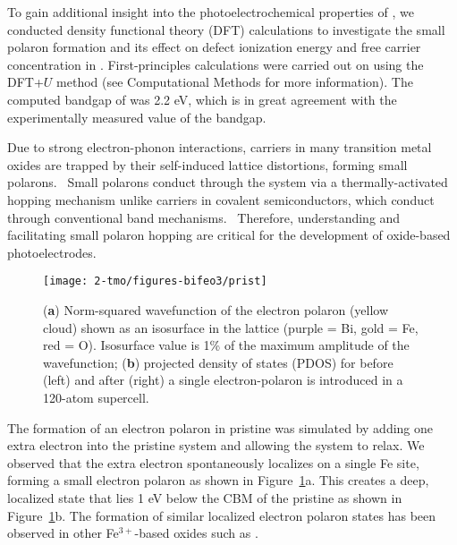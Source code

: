 To gain additional insight into the photoelectrochemical properties of , we conducted density functional theory (DFT) calculations to investigate the small polaron formation and its effect on defect ionization energy and free carrier concentration in . First-principles calculations were carried out on  using the DFT+$U$ method (see Computational Methods for more information). The computed bandgap of  was 2.2 eV, which is in great agreement with the experimentally measured value of the bandgap.

Due to strong electron-phonon interactions, carriers in many transition metal oxides are trapped by their self-induced lattice distortions, forming small polarons.~\cite{geneste2019polarons} Small polarons conduct through the system via a thermally-activated hopping mechanism unlike carriers in covalent semiconductors, which conduct through conventional band mechanisms.~\cite{lu2010room,gheorghiu2013preparation} Therefore, understanding and facilitating small polaron hopping are critical for the development of oxide-based photoelectrodes.~\cite{wheeler2019combined,smart2019optical,smart2018mechanistic,seo2018role,wu2018combining,zhang2018unconventional}


\begin{figure}
    \centering
    \texttt{[image: 2-tmo/figures-bifeo3/prist]}
    \caption{
        (\textbf{a}) Norm-squared wavefunction of the electron polaron (yellow cloud) shown as an isosurface in the  lattice (purple = Bi, gold = Fe, red = O). Isosurface value is 1\% of the maximum amplitude of the wavefunction; (\textbf{b}) projected density of states (PDOS) for  before (left) and after (right) a single electron-polaron is introduced in a 120-atom supercell.
    }
    \label{bifeo3:fig:prist}
\end{figure}

The formation of an electron polaron in pristine  was simulated by adding one extra electron into the pristine  system and allowing the system to relax. We observed that the extra electron spontaneously localizes on a single Fe site, forming a small electron polaron as shown in Figure~\ref{bifeo3:fig:prist}a. This creates a deep, localized state that lies 1 eV below the CBM of the pristine  as shown in Figure~\ref{bifeo3:fig:prist}b. The formation of similar localized electron polaron states has been observed in other Fe$^{3+}$-based oxides such as .~\cite{smart2017effect}

